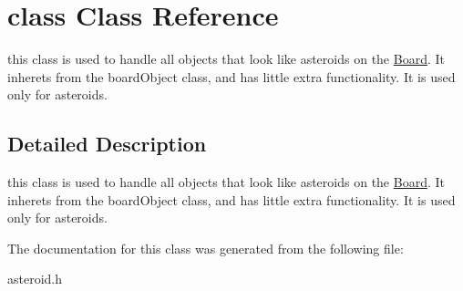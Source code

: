 \hypertarget{classclass}{}\section{class Class Reference}
\label{classclass}


this class is used to handle all objects that look like asteroids on the \hyperlink{class_board}{Board}. It inherets from the board\+Object class, and has little extra functionality. It is used only for asteroids.  




\subsection{Detailed Description}
this class is used to handle all objects that look like asteroids on the \hyperlink{class_board}{Board}. It inherets from the board\+Object class, and has little extra functionality. It is used only for asteroids. 

The documentation for this class was generated from the following file\+:\begin{DoxyCompactItemize}
\item 
asteroid.\+h\end{DoxyCompactItemize}
